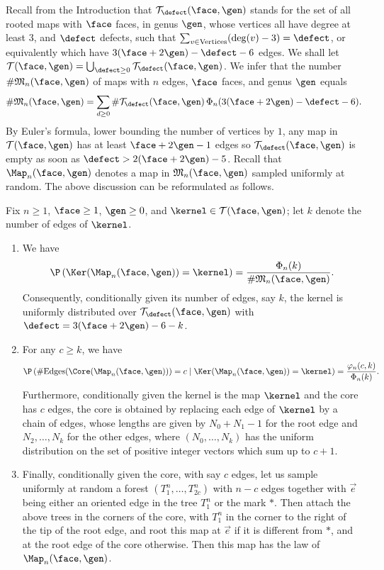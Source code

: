 Recall from the Introduction that
$\mathcal{T}_{\defect}(\face,\gen)$ stands for the set of all rooted maps with $ \face$ faces, in genus $ \gen$, whose vertices all have degree at least $3$, and $\defect$ defects, \ie such that $\sum_{v \in \mathrm{Vertices}} (\deg(v)-3) = \defect$, or equivalently which have $3(\face+2\gen) - \defect - 6$ edges.
We shall let $\mathcal{T}(\face,\gen) = \bigcup_{\defect \ge 0} \mathcal{T}_{\defect}(\face,\gen)$.
We infer that the number $\#\mathfrak{M}_n(\face,\gen)$ of maps with $n$ edges, $\face$ faces, and genus $\gen$ equals
\[
\#\mathfrak{M}_n(\face,\gen) = \sum_{d \ge 0} \# \mathcal{T}_{\defect}(\face,\gen)\, \Phi_n(3(\face+2\gen) - \defect - 6).
\]
By Euler's formula, lower bounding the number of vertices by $1$, any map in $\mathcal{T}(\face,\gen)$ has at least $\face+2\gen-1$ edges so $\mathcal{T}_{\defect}(\face,\gen)$ is empty as soon as $\defect > 2(\face+2\gen)-5$.
Recall that $\Map_{n}(\face,\gen)$ denotes a map in $\mathfrak{M}_n(\face,\gen)$ sampled uniformly at random.
The above discussion can be reformulated as follows.

\begin{proposition}\label{prop:loi_core_kernel}
Fix $n\ge1$, $\face \geq 1$, $\gen\ge0$, and $\kernel \in \mathcal{T}(\face,\gen)$; let $k$ denote the number of edges of $\kernel$.
\begin{enumerate}
\item We have
\[
\P \left(\Ker(\Map_n(\face,\gen)) = \kernel \right) = \frac{\Phi_{n}(k)}{\# \mathfrak{M}_n(\face,\gen)}.
\]
Consequently, conditionally given its number of edges, say
$k$, the kernel is uniformly distributed over $\mathcal{T}_\defect(\face,\gen)$ with $\defect=3(\face+2\gen)-6-k$.

\item For any $c \geq k$, we have
\[
\P \left(\#\mathrm{Edges}(\Core(\Map_n(\face,\gen))) = c \;\middle|\; \Ker(\Map_n(\face,\gen)) = \kernel \right) = \frac{\varphi_{n}(c,k)}{\Phi_{n}(k)}.
\]
Furthermore, conditionally given
the kernel is the map $\kernel$ and the core has $c$ edges, the core is obtained by replacing each edge of $\kernel$ by a chain of edges,
whose lengths are given by $N_0+N_1-1$ for the root edge and $N_2, \dots, N_k$ for the other edges, where $(N_0, \dots, N_k)$ has the uniform distribution on the set of positive integer vectors which sum up to $c+1$.

\item Finally, conditionally given the core, with say $c$ edges, let us sample uniformly at random a forest $(T^n_{1}, \dots, T^n_{2c})$ with $n-c$ edges together with $\vec{e}$ being either an oriented edge in the tree $T^n_1$ or the mark $\ast$.
Then attach the above trees in the corners of the core, with $T^n_1$ in the corner to the right of the tip of the root edge, and root this map at $\vec{e}$ if it is different from $\ast$, and at the root edge of the core otherwise. Then this map has the law of $\Map_n(\face,\gen)$.
\end{enumerate}
\end{proposition}

